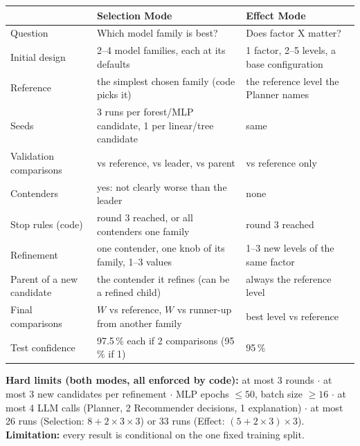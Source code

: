 \documentclass[11pt]{article}
\begin{document}
{\small
\begin{tabularx}{\linewidth}{@{}l Y Y@{}}
\toprule
 & \textbf{Selection Mode} & \textbf{Effect Mode}\\ \midrule
Question & Which model family is best? & Does factor X matter?\\
Initial design & 2--4 model families, each at its defaults & 1 factor, 2--5 levels, a base configuration\\
Reference & the simplest chosen family (code picks it) & the reference level the Planner names\\
Seeds & 3 runs per forest/MLP candidate, 1 per linear/tree candidate & same\\
Validation comparisons & vs reference, vs leader, vs parent & vs reference only\\
Contenders & yes: not clearly worse than the leader & none\\
Stop rules (code) & round 3 reached, or all contenders one family & round 3 reached\\
Refinement & one contender, one knob of its family, 1--3 values & 1--3 new levels of the same factor\\
Parent of a new candidate & the contender it refines (can be a refined child) & always the reference level\\
Final comparisons & $W$ vs reference, $W$ vs runner-up from another family & best level vs reference\\
Test confidence & 97.5\,\% each if 2 comparisons (95\,\% if 1) & 95\,\%\\
\bottomrule
\end{tabularx}}

\vspace{8pt}
{\small\textbf{Hard limits (both modes, all enforced by code):} at most 3 rounds $\cdot$ at most 3 new
candidates per refinement $\cdot$ MLP epochs $\le 50$, batch size $\ge 16$ $\cdot$ at most 4 LLM calls
(Planner, 2 Recommender decisions, 1 explanation) $\cdot$ at most 26 runs (Selection: $8 + 2 \times 3
\times 3$) or 33 runs (Effect: $(5 + 2 \times 3) \times 3$).
\textbf{Limitation:} every result is conditional on the one fixed training split.}
\end{document}
